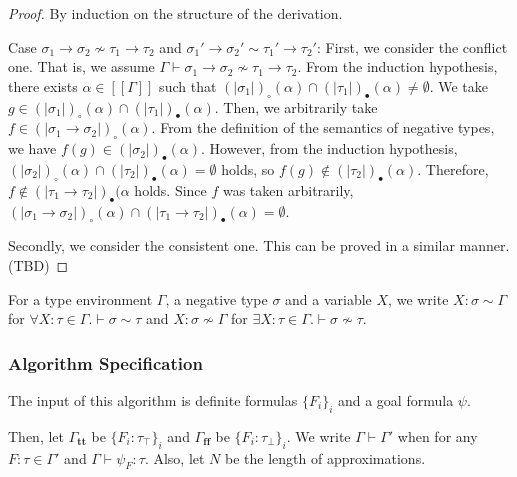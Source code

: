 \documentclass[runningheads]{llncs}
\newcommand\COL{\mathbin{:}}
\newcommand \true {\textbf{tt}}
\newcommand \false {\textbf{ff}}
\newcommand {\val}[1]{[\![#1]\!]}
\newcommand {\semt}[1]{(\!|#1|\!)_\bullet}
\newcommand {\semtf}[1]{(\!|#1|\!)_\circ}
\newcommand {\conflict}{\not \sim}
\newcommand {\consistent}{\sim}
\begin{document}
\begin{proof}
By induction on the structure of the derivation.

Case \( \sigma_1 \to \sigma_2 \conflict \tau_1 \to \tau_2 \)
and \( \sigma_1' \to \sigma_2' \consistent \tau_1' \to \tau_2' \):
First, we consider the conflict one. That is, we assume \( \Gamma \vdash \sigma_1 \to \sigma_2 \conflict \tau_1 \to \tau_2 \).
From the induction hypothesis, there exists \( \alpha \in \val{\Gamma} \) such that \( \semtf{\sigma_1}(\alpha) \cap \semt{\tau_1}(\alpha) \neq \emptyset \).
We take \( g \in  \semtf{\sigma_1}(\alpha) \cap \semt{\tau_1}(\alpha) \). Then, we arbitrarily take \( f \in \semtf{\sigma_1 \to \sigma_2}(\alpha) \).
From the definition of the semantics of negative types, we have \( f(g) \in \semt{\sigma_2}(\alpha) \).
However, from the induction hypothesis, \( \semtf{\sigma_2}(\alpha) \cap \semt{\tau_2}(\alpha) = \emptyset \) holds, so
\( f(g) \not \in \semt{\tau_2}(\alpha) \).
Therefore, \( f \not \in \semt{\tau_1 \to \tau_2}(\alpha \) holds.
Since \( f \) was taken arbitrarily, \( \semtf{\sigma_1 \to \sigma_2}(\alpha) \cap \semt{\tau_1 \to \tau_2}(\alpha) = \emptyset \).

Secondly, we consider the consistent one. This can be proved in a similar manner. (TBD)
\end{proof}


For a type environment \( \Gamma \), a negative type \( \sigma \) and a variable \( X \), we write \( X : \sigma \consistent \Gamma \) for \( \forall X \COL \tau \in \Gamma. \vdash \sigma \consistent \tau \) and \(X : \sigma \conflict \Gamma\)
for \( \exists X \COL \tau \in \Gamma. \vdash \sigma \conflict \tau \).

\subsubsection{Algorithm Specification}

The input of this algorithm is definite formulas \(\{F_i\}_i\) and a goal formula
\(\psi\).

Then, let \( \Gamma_\true \) be \( \{F_i: \tau_\top\}_i \)
and \( \Gamma_\false \) be \( \{F_i: \tau_\bot \}_i \).
We write \( \Gamma \vdash \Gamma' \) when for any \( F \COL \tau \in \Gamma' \)
and \( \Gamma \vdash \psi_F \COL \tau \).
Also, let \( N \) be the length of approximations.
\end{document}
